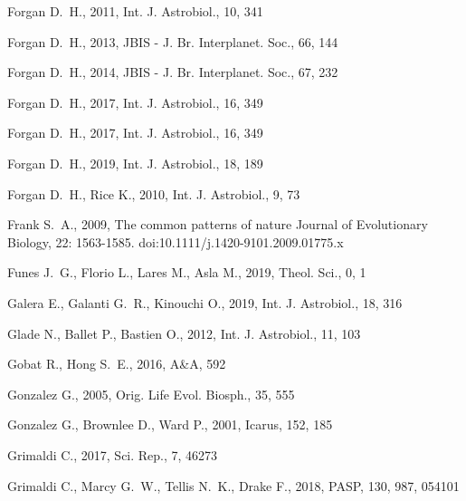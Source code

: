 \documentclass[crop]{CSLB}
\begin{document}
\begin{thebibliography}{95}
Forgan D.~H., 2011, Int. J. Astrobiol., 10, 341

Forgan D.~H., 2013, JBIS - J. Br. Interplanet. Soc., 66, 144

Forgan D.~H., 2014, JBIS - J. Br. Interplanet. Soc., 67, 232

Forgan D.~H., 2017{}, Int. J. Astrobiol., 16, 349

Forgan D.~H., 2017{}, Int. J. Astrobiol., 16, 349

Forgan D.~H., 2019, Int. J. Astrobiol., 18, 189

Forgan D.~H., Rice K., 2010, Int. J. Astrobiol., 9, 73

Frank S.~A., 2009, {The common patterns of nature} Journal of Evolutionary Biology, 22: 1563-1585. doi:10.1111/j.1420-9101.2009.01775.x

Funes J.~G., Florio L., Lares M., Asla M., 2019, Theol. Sci., 0, 1

Galera E., Galanti G.~R., Kinouchi O., 2019, Int. J. Astrobiol., 18, 316

Glade N., Ballet P., Bastien O., 2012, Int. J. Astrobiol., 11, 103

   Gobat R., Hong S.~E., 2016, A\&A, 592

Gonzalez G., 2005, Orig. Life Evol. Biosph., 35, 555

Gonzalez G., Brownlee D., Ward P., 2001, Icarus, 152, 185

Grimaldi C., 2017, Sci. Rep., 7, 46273

Grimaldi C., Marcy G.~W., Tellis N.~K., Drake F., 2018, PASP, 130, 987, 054101


\end{thebibliography}
\end{document}

